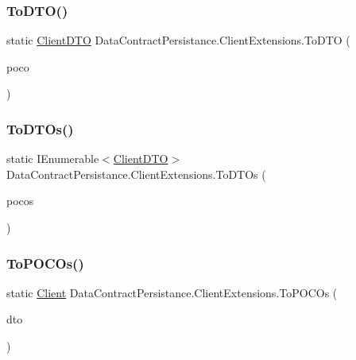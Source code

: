 \subsubsection{\texorpdfstring{To\+D\+T\+O()}{ToDTO()}}
{\footnotesize\ttfamily static \hyperlink{classDataContractPersistance_1_1ClientDTO}{Client\+D\+TO} Data\+Contract\+Persistance.\+Client\+Extensions.\+To\+D\+TO (\begin{DoxyParamCaption}\item[{this \hyperlink{classModele_1_1Client}{Client}}]{poco }\end{DoxyParamCaption})\hspace{0.3cm}{\ttfamily [static]}}

\mbox{\label{classDataContractPersistance_1_1ClientExtensions_af12938f02708adcb6bb89f0345f121b5}} 
\subsubsection{\texorpdfstring{To\+D\+T\+Os()}{ToDTOs()}}
{\footnotesize\ttfamily static I\+Enumerable$<$\hyperlink{classDataContractPersistance_1_1ClientDTO}{Client\+D\+TO}$>$ Data\+Contract\+Persistance.\+Client\+Extensions.\+To\+D\+T\+Os (\begin{DoxyParamCaption}\item[{this I\+Enumerable$<$ \hyperlink{classModele_1_1Client}{Client} $>$}]{pocos }\end{DoxyParamCaption})\hspace{0.3cm}{\ttfamily [static]}}

\mbox{\label{classDataContractPersistance_1_1ClientExtensions_a3492e2affc56bac7ca3febd377ce9e37}} 
\subsubsection{\texorpdfstring{To\+P\+O\+C\+Os()}{ToPOCOs()}\hspace{0.1cm}{\footnotesize\ttfamily [1/2]}}
{\footnotesize\ttfamily static \hyperlink{classModele_1_1Client}{Client} Data\+Contract\+Persistance.\+Client\+Extensions.\+To\+P\+O\+C\+Os (\begin{DoxyParamCaption}\item[{this \hyperlink{classDataContractPersistance_1_1ClientDTO}{Client\+D\+TO}}]{dto }\end{DoxyParamCaption})\hspace{0.3cm}{\ttfamily [static]}}

